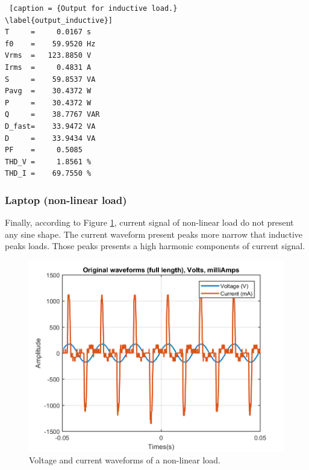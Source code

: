 \documentclass[journal]{IEEEtran}
\begin{document}
\begin{lstlisting} [caption = {Output for inductive load.}
\label{output_inductive}]
T     =     0.0167 s 
f0    =    59.9520 Hz 
Vrms  =   123.8850 V
Irms  =     0.4831 A
S     =    59.8537 VA
Pavg  =    30.4372 W 
P     =    30.4372 W 
Q     =    38.7767 VAR 
D_fast=    33.9472 VA 
D     =    33.9434 VA 
PF    =     0.5085 
THD_V =     1.8561 %
THD_I =    69.7550 %
\end{lstlisting}

\subsubsection{Laptop (non-linear load)} Finally, 
according to Figure \ref{original_no_lineal_load},  
current signal of non-linear load do not present any 
sine shape. The current waveform present peaks more 
narrow that inductive peaks loads. Those peaks 
presents a high harmonic components of current signal. 


\begin{figure}[h]
\centering
\includegraphics[clip,width=\columnwidth]
{original_waveform_computer.png}
\caption{Voltage and current waveforms of a non-linear load.}
\label{original_no_lineal_load}
\end{figure}
\end{document}

